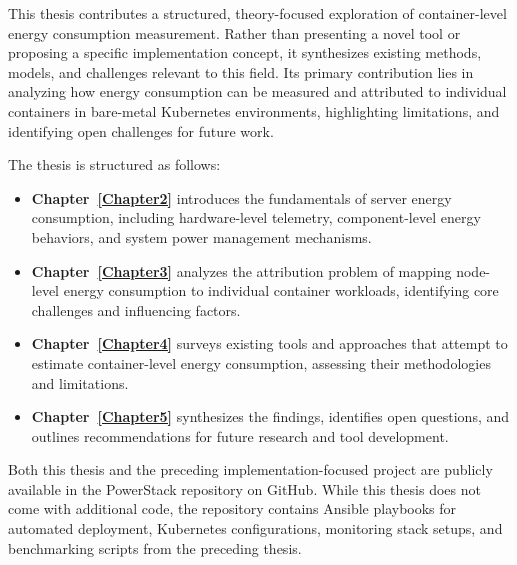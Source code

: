 This thesis contributes a structured, theory-focused exploration of container-level energy consumption measurement. Rather than presenting a novel tool or proposing a specific implementation concept, it synthesizes existing methods, models, and challenges relevant to this field. Its primary contribution lies in analyzing how energy consumption can be measured and attributed to individual containers in bare-metal Kubernetes environments, highlighting limitations, and identifying open challenges for future work.

The thesis is structured as follows:

\begin{itemize}
\item \textbf{Chapter~\ref{Chapter2}} introduces the fundamentals of server energy consumption, including hardware-level telemetry, component-level energy behaviors, and system power management mechanisms.
\item \textbf{Chapter~\ref{Chapter3}} analyzes the attribution problem of mapping node-level energy consumption to individual container workloads, identifying core challenges and influencing factors.
\item \textbf{Chapter~\ref{Chapter4}} surveys existing tools and approaches that attempt to estimate container-level energy consumption, assessing their methodologies and limitations.
\item \textbf{Chapter~\ref{Chapter5}} synthesizes the findings, identifies open questions, and outlines recommendations for future research and tool development.
\end{itemize}

Both this thesis and the preceding implementation-focused project are publicly available in the PowerStack\parencite{PowerStack} repository on GitHub. While this thesis does not come with additional code, the repository contains Ansible playbooks for automated deployment, Kubernetes configurations, monitoring stack setups, and benchmarking scripts from the preceding thesis.
